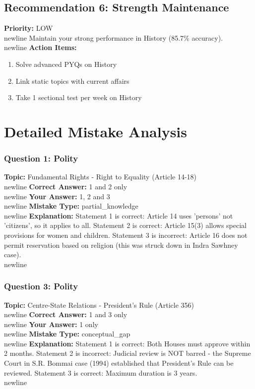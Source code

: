 \documentclass[a4paper,12pt]{article}
\begin{document}
\subsection{Recommendation 6: Strength Maintenance}
\textbf{Priority:} \textcolor{correctgreen}{LOW}\\newline
Maintain your strong performance in History (85.7\% accuracy).\\newline
\textbf{Action Items:}\newline
\begin{enumerate}
\item Solve advanced PYQs on History
\item Link static topics with current affairs
\item Take 1 sectional test per week on History
\end{enumerate}
\section{Detailed Mistake Analysis}
\subsubsection{Question 1: Polity}
\textbf{Topic:} Fundamental Rights - Right to Equality (Article 14-18)\\newline
\textbf{Correct Answer:} 1 and 2 only\\newline
\textbf{Your Answer:} \textcolor{wrongred}{1, 2 and 3}\\newline
\textbf{Mistake Type:} partial\_knowledge\\newline
\textbf{Explanation:} Statement 1 is correct: Article 14 uses 'persons' not 'citizens', so it applies to all. Statement 2 is correct: Article 15(3) allows special provisions for women and children. Statement 3 is incorrect: Article 16 does not permit reservation based on religion (this was struck down in Indra Sawhney case).\\newline
\vspace{0.5cm}
\subsubsection{Question 3: Polity}
\textbf{Topic:} Centre-State Relations - President's Rule (Article 356)\\newline
\textbf{Correct Answer:} 1 and 3 only\\newline
\textbf{Your Answer:} \textcolor{wrongred}{1 only}\\newline
\textbf{Mistake Type:} conceptual\_gap\\newline
\textbf{Explanation:} Statement 1 is correct: Both Houses must approve within 2 months. Statement 2 is incorrect: Judicial review is NOT barred - the Supreme Court in S.R. Bommai case (1994) established that President's Rule can be reviewed. Statement 3 is correct: Maximum duration is 3 years.\\newline
\vspace{0.5cm}
\end{document}
